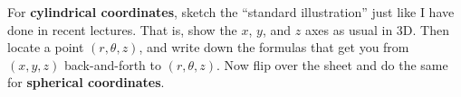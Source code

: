 For \textbf{cylindrical coordinates}, sketch the ``standard illustration'' just like I have done in recent lectures.  That is, show the $x$, $y$, and $z$ axes as usual in 3D.  Then locate a point $(r,\theta,z)$, and write down the formulas that get you from $(x,y,z)$ back-and-forth to $(r,\theta,z)$.  Now flip over the sheet and do the same for \textbf{spherical coordinates}.
